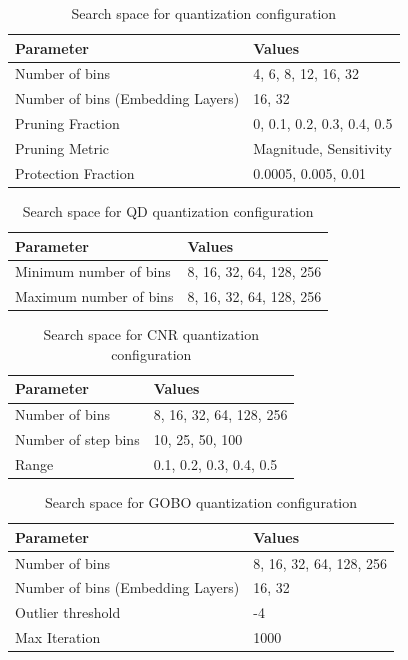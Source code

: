 \begin{table}[htpb]
\centering
\small
\begin{tabular}{l l}\\
\toprule
Parameter & Values \\
\midrule
Number of bins & 4, 6, 8, 12, 16, 32 \\
Number of bins (Embedding Layers) & 16, 32 \\
Pruning Fraction & 0, 0.1, 0.2, 0.3, 0.4, 0.5 \\
Pruning Metric & Magnitude, Sensitivity \\
Protection Fraction & 0.0005, 0.005, 0.01 \\
\bottomrule
\end{tabular}
\caption{Search space for \sys quantization configuration}
\label{tab:search-space}
\end{table}

\begin{table}[htbp]
\centering
\small
\begin{tabular}{l l}\\
\toprule
Parameter & Values \\
\midrule
Minimum number of bins & 8, 16, 32, 64, 128, 256 \\
Maximum number of bins & 8, 16, 32, 64, 128, 256 \\
\bottomrule
\end{tabular}
\caption{Search space for QD quantization configuration}
\label{tab:QDsearch-space}
\end{table}

\begin{table}[htbp]
\centering
\small
\begin{tabular}{l l}\\
\toprule
Parameter & Values \\
\midrule
Number of bins & 8, 16, 32, 64, 128, 256 \\
Number of step bins & 10, 25, 50, 100 \\
Range & 0.1, 0.2, 0.3, 0.4, 0.5 \\
\bottomrule
\end{tabular}
\caption{Search space for CNR quantization configuration}
\label{tab:CNRsearch-space}
\end{table}

\begin{table}[htpb]
\centering
\small
\begin{tabular}{l l}\\
\toprule
Parameter & Values \\
\midrule
Number of bins & 8, 16, 32, 64, 128, 256 \\
Number of bins (Embedding Layers) & 16, 32 \\
Outlier threshold & -4 \\
Max Iteration & 1000 \\
\bottomrule
\end{tabular}
\caption{Search space for GOBO quantization configuration}
\label{tab:GOBOsearch-space}
\end{table}
